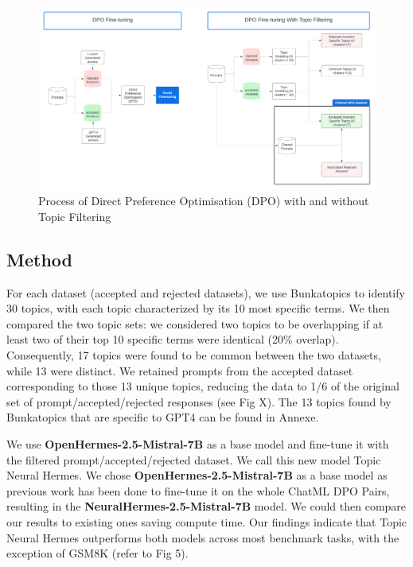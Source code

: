 \documentclass{article}
\begin{document}
\begin{figure}[h] %
  \centering %
  \includegraphics[width=12cm]{img/Bunka - DPO - Fine-tuning.png} %
  \caption{Process of Direct Preference Optimisation (DPO) with and without Topic Filtering} %
\end{figure}

\subsection{Method}

For each dataset (accepted and rejected datasets), we use Bunkatopics to identify 30 topics, with each topic characterized by its 10 most specific terms. We then compared the two topic sets: we considered two topics to be overlapping if at least two of their top 10 specific terms were identical (20\% overlap). Consequently, 17 topics were found to be common between the two datasets, while 13 were distinct. We retained prompts from the accepted dataset corresponding to those 13 unique topics, reducing the data to 1/6 of the original set of prompt/accepted/rejected responses (see Fig X). The 13 topics found by Bunkatopics that are specific to GPT4 can be found in Annexe.

We use \textbf{OpenHermes-2.5-Mistral-7B} as a base model and fine-tune it with the filtered  prompt/accepted/rejected dataset. We call this new model Topic Neural Hermes. We chose \textbf{OpenHermes-2.5-Mistral-7B} as a base model as previous work has been done to fine-tune it on the whole ChatML DPO Pairs, resulting in the \textbf{NeuralHermes-2.5-Mistral-7B} model. We could then compare our results to existing ones saving compute time. Our findings indicate that Topic Neural Hermes outperforms both models across most benchmark tasks, with the exception of GSM8K (refer to Fig 5).
\end{document}
